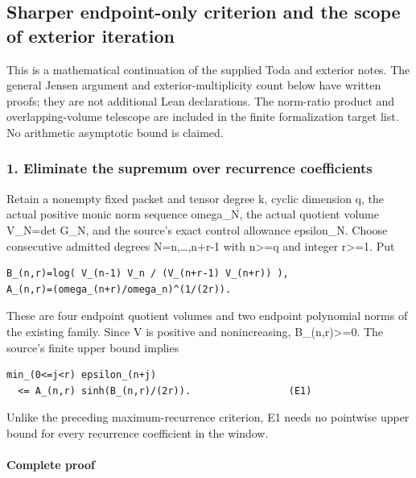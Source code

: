 \subsection{Sharper endpoint-only criterion and the scope of exterior iteration}\label{endpoint-pr23_corrected--sharper-endpoint-only-criterion-and-the-scope-of-exterior-iteration}

This is a mathematical continuation of the supplied Toda and exterior notes. The general Jensen argument and exterior-multiplicity count below have written proofs; they are not additional Lean declarations. The norm-ratio product and overlapping-volume telescope are included in the finite formalization target list. No arithmetic asymptotic bound is claimed.

\subsubsection{1. Eliminate the supremum over recurrence coefficients}\label{endpoint-pr23_corrected--eliminate-the-supremum-over-recurrence-coefficients}

Retain a nonempty fixed packet and tensor degree k, cyclic dimension q, the actual positive monic norm sequence omega\_N, the actual quotient volume V\_N=det G\_N, and the source's exact control allowance epsilon\_N. Choose consecutive admitted degrees N=n,\ldots,n+r-1 with n\textgreater=q and integer r\textgreater=1. Put

\begin{verbatim}
B_(n,r)=log( V_(n-1) V_n / (V_(n+r-1) V_(n+r)) ),
A_(n,r)=(omega_(n+r)/omega_n)^(1/(2r)).
\end{verbatim}

These are four endpoint quotient volumes and two endpoint polynomial norms of the existing family. Since V is positive and nonincreasing, B\_(n,r)\textgreater=0. The source's finite upper bound implies

\begin{verbatim}
min_(0<=j<r) epsilon_(n+j)
  <= A_(n,r) sinh(B_(n,r)/(2r)).                 (E1)
\end{verbatim}

Unlike the preceding maximum-recurrence criterion, E1 needs no pointwise upper bound for every recurrence coefficient in the window.

\paragraph{Complete proof}\label{endpoint-pr23_corrected--complete-proof}

